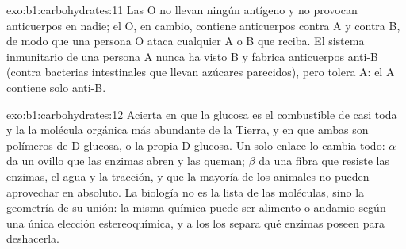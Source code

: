 \begin{solution}{exo:b1:carbohydrates:11}
Las  O no llevan ningún antígeno y no provocan anticuerpos en nadie;
el  O, en cambio, contiene anticuerpos contra A y contra B, de modo
que una persona O ataca cualquier  A o B que reciba. El sistema
inmunitario de una persona A nunca ha visto B y fabrica anticuerpos anti-B
(contra bacterias intestinales que llevan azúcares parecidos), pero tolera
A: el  A contiene solo anti-B.
\end{solution}

\begin{solution}{exo:b1:carbohydrates:12}
Acierta en que la glucosa es el combustible de casi toda  y la
 la molécula orgánica más abundante de la Tierra, y en que ambas son
polímeros de D-glucosa, o la propia D-glucosa. Un solo enlace lo cambia
todo: $\alpha$ da un ovillo que las enzimas abren y las  queman;
$\beta$ da una fibra que resiste las enzimas, el agua y la tracción, y que
la mayoría de los animales no pueden aprovechar en absoluto. La biología no
es la lista de las moléculas, sino la geometría de su unión: la misma
química puede ser alimento o andamio según una única elección
estereoquímica, y a los  los separa qué enzimas poseen para
deshacerla.
\end{solution}

